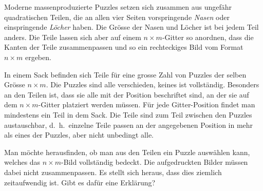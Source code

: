 Moderne massenproduzierte Puzzles setzen sich zusammen aus ungefähr
quadratischen Teilen, die an allen vier Seiten vorspringende {\em Nasen} oder
einspringende {\em Löcher} haben.
Die Grösse der Nasen und Löcher ist bei jedem Teil anders.
Die Teile lassen sich aber auf einem $n\times m$-Gitter so anordnen,
dass die Kanten der Teile zusammenpassen und so ein rechteckiges Bild
vom Format $n\times m$ ergeben.

\begin{center}
\end{center}

In einem Sack befinden sich Teile für eine grosse Zahl von Puzzles der
selben Grösse $n\times m$.
Die Puzzles sind alle verschieden, keines ist vollständig.
Besonders an den Teilen ist, dass sie alle mit der Position beschriftet
sind, an der sie auf dem $n\times m$-Gitter platziert werden müssen.
Für jede Gitter-Position findet man mindestens ein Teil in dem Sack.
Die Teile sind zum Teil zwischen den Puzzles austauschbar, d.~h.~einzelne
Teile passen an der angegebenen Position in mehr als eines der Puzzles,
aber nicht unbedingt alle.

Man möchte herausfinden, ob man aus den Teilen ein Puzzle auswählen kann,
welches das $n\times m$-Bild vollständig bedeckt.
Die aufgedruckten Bilder müssen dabei nicht zusammenpassen.
Es stellt sich heraus, dass dies ziemlich zeitaufwendig ist.
Gibt es dafür eine Erklärung?

